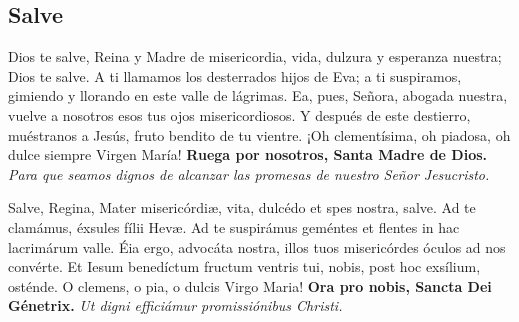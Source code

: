 \documentclass[./devocionario.tex]{subfiles}
\begin{document}
\subsection*{Salve}
\begin{multicols}{2}
    Dios te salve, Reina y Madre de mi­se­ri­cordia, vida, dulzura y esperanza nuestra; Dios te salve. 
    A ti llamamos los desterrados hijos de Eva; a ti suspiramos, gimiendo y llorando en este valle de lágrimas. 
    Ea, pues, Señora, abogada nuestra, vuelve a nosotros esos tus ojos mi­se­ri­cordiosos. Y después de este destierro, muéstranos a Jesús, 
    fruto bendito de tu vientre. ¡Oh cle­men­tísima, oh piadosa, oh dulce siempre Virgen María!\newline
    \textbf{Ruega por nosotros, Santa Madre de Dios.}\newline
    \textit{Para que seamos dignos de alcanzar las promesas de nuestro Señor Jesucristo.}

    \columnbreak
    
    Salve, Regina, Mater mi­se­ri­córdiæ, vita, dulcédo et spes nostra, salve. Ad te clamámus, éxsules fílii Hevæ. 
    Ad te suspirámus geméntes et flentes in hac lacrimárum valle. Éia ergo, advocáta nostra, illos tuos mi­se­ri­córdes óculos ad nos convérte. 
    Et Iesum benedíctum fructum ventris tui, nobis, post hoc exsílium, osténde. O clemens, o pia, o dulcis Virgo Maria!\newline
    \textbf{Ora pro nobis, Sancta Dei Génetrix.}\newline
    \textit{Ut digni efficiámur pro­mi­ssiónibus Christi.}
\end{multicols}
    
\end{document}
